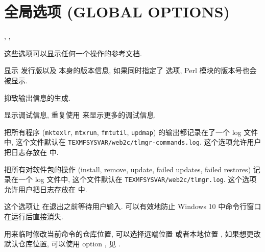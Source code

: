 \section{全局选项 (GLOBAL OPTIONS)}
\begin{description}
    \item {}, , \par
    这些选项可以显示任何一个操作的参考文档. 
    \item {}\par
    显示 \tl 发行版以及 \tlmgr 本身的版本信息, 如果同时指定了  选项, \tl{} Perl 模块的版本号也会被显示. 
    \item {}\par
    抑致输出信息的生成. 
    \item {}\par
    显示调试信息, 重复使用  来显示更多的调试信息. 
    \item {} \par
    \tlmgr 把所有程序 (\texttt{mktexlr}, \texttt{mtxrun}, \texttt{fmtutil}, \texttt{updmap}) 的输出都记录在了一个 log 文件中, 这个文件默认在 \texttt{TEXMFSYSVAR/web2c/tlmgr-commands.log}. 这个选项允许用户把日志存放在  中. 
    \item {} \par
    \tlmgr 把所有对软件包的操作 (\ac{install}, \ac{remove}, \ac{update}, failed updates, failed restores) 记录在一个 log 文件中, 这个文件默认在 \texttt{TEXMFSYSVAR/web2c/tlmgr.log}. 这个选项允许用户把日志存放在  中. 
    \item {}\par
    这个选项让 \tlmgr 在退出之前等待用户输入. 可以有效地防止 Windows 10 中命令行窗口在运行后直接消失. 
    \item {} \par
    用来临时修改当前命令的仓库位置, 可以选择远端位置  或者本地位置 , 如果想更改默认仓库位置, 可以使用 \tlmgr{} \ac{option} , 见 . 
\end{description}